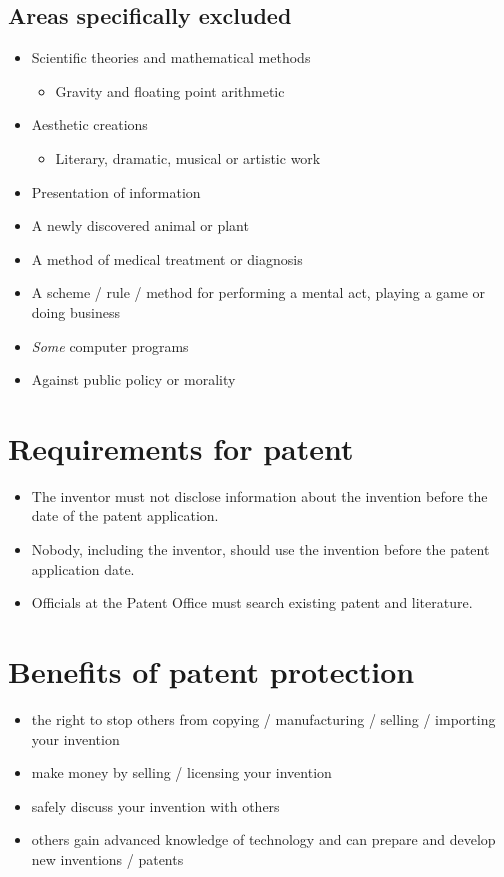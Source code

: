 \documentclass{article}
\begin{document}
\subsection{Areas specifically excluded}
\begin{itemize}
\item Scientific theories and mathematical methods
\begin{itemize}
\item Gravity and floating point arithmetic
\end{itemize}
\item Aesthetic creations
\begin{itemize}
\item Literary, dramatic, musical or artistic work 
\end{itemize}
\item Presentation of information
\item A newly discovered animal or plant
\item A method of medical treatment or diagnosis
\item A scheme / rule / method for performing a mental act, playing a game or doing business
\item \emph{Some} computer programs
\item Against public policy or morality
\end{itemize}



\section{Requirements for patent}
\begin{itemize}
\item The inventor must not disclose information about the invention before the date of the patent application.
\item Nobody, including the inventor, should use the invention before the patent application date.
\item Officials at the Patent Office must search existing patent and literature. 
\end{itemize}



\section{Benefits of patent protection}
\begin{itemize}
\item the right to stop others from copying / manufacturing / selling / importing your invention
\item make money by selling / licensing your invention
\item safely discuss your invention with others
\item others gain advanced knowledge of technology and can prepare and develop new inventions / patents
\end{itemize}
\end{document}
